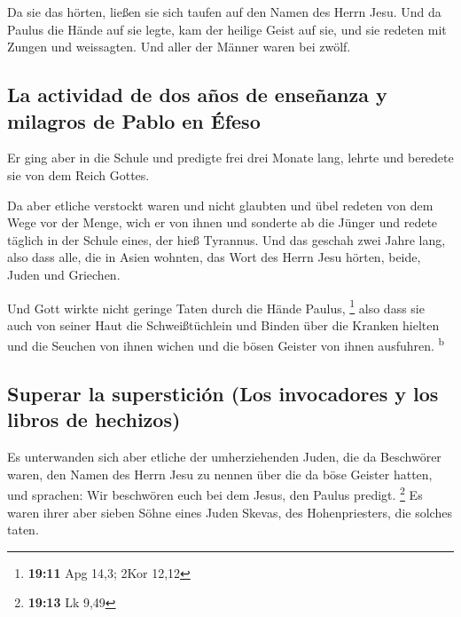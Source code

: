 Da sie das hörten, ließen sie sich taufen auf den Namen
des Herrn Jesu.  Und da Paulus die Hände auf sie legte,
kam der heilige Geist auf sie, und sie redeten mit Zungen und
weissagten.  Und aller der Männer waren bei zwölf.

\hypertarget{la-actividad-de-dos-auxf1os-de-enseuxf1anza-y-milagros-de-pablo-en-uxe9feso}{%
\subsection{La actividad de dos años de enseñanza y milagros de Pablo en
Éfeso}\label{la-actividad-de-dos-auxf1os-de-enseuxf1anza-y-milagros-de-pablo-en-uxe9feso}}

 Er ging aber in die Schule und predigte frei drei Monate
lang, lehrte und beredete sie von dem Reich Gottes.

 Da aber etliche verstockt waren und nicht glaubten und
übel redeten von dem Wege vor der Menge, wich er von ihnen und sonderte
ab die Jünger und redete täglich in der Schule eines, der hieß Tyrannus.
 Und das geschah zwei Jahre lang, also dass alle, die in
Asien wohnten, das Wort des Herrn Jesu hörten, beide, Juden und
Griechen.

 Und Gott wirkte nicht geringe Taten durch die Hände
Paulus, \footnote{\textbf{19:11} Apg 14,3; 2Kor 12,12} 
also dass sie auch von seiner Haut die Schweißtüchlein und Binden über
die Kranken hielten und die Seuchen von ihnen wichen und die bösen
Geister von ihnen ausfuhren. \textsuperscript{b}

\hypertarget{superar-la-supersticiuxf3n-los-invocadores-y-los-libros-de-hechizos}{%
\subsection{Superar la superstición (Los invocadores y los libros de
hechizos)}\label{superar-la-supersticiuxf3n-los-invocadores-y-los-libros-de-hechizos}}

 Es unterwanden sich aber etliche der umherziehenden
Juden, die da Beschwörer waren, den Namen des Herrn Jesu zu nennen über
die da böse Geister hatten, und sprachen: Wir beschwören euch bei dem
Jesus, den Paulus predigt. \footnote{\textbf{19:13} Lk 9,49}
 Es waren ihrer aber sieben Söhne eines Juden Skevas, des
Hohenpriesters, die solches taten.

